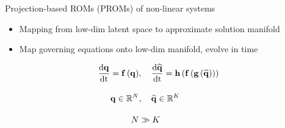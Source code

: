 \documentclass[]{beamer}
\begin{document}
\begin{frame}{Projection-based ROMs (PROMs) of non-linear systems}
    \begin{itemize}
        \item Mapping from low-dim latent space to approximate solution manifold
        \item Map governing equations onto low-dim manifold, evolve in time
    \end{itemize}
	\centering
	\begin{minipage}{0.49\linewidth}
		\centering
		\vspace{-2em}
		\begin{align*}
			\frac{\text{d} \mathbf{q}}{\text{d} \text{t}} = \mathbf{f} \left(\mathbf{q}\right)&, \quad \frac{\text{d} \mathbf{\widehat{q}}}{\text{d} \text{t}} = \mathbf{h} \left(\mathbf{f} \left(\mathbf{g} \left(\mathbf{\widehat{q}}\right)\right)\right) \\[1em]
			\mathbf{q} \in \mathbb{R}^{N}&, \quad \mathbf{\widehat{q}} \in \mathbb{R}^{K} \\[1em]
			N &\gg K
		\end{align*}
	\end{minipage}
	\hspace{-2em}
	\begin{minipage}{0.49\linewidth}
		\begin{figure}

\end{figure}
\end{minipage}
\end{frame}
\end{document}

